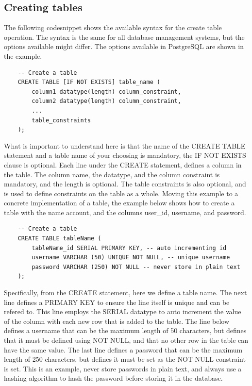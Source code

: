 \subsection{Creating tables}
The following codesnippet shows the available syntax for the create table operation. The syntax is the same for all database management systems, but the options available might differ. The options available in PostgreSQL are shown in the example.

\begin{verbatim}
    -- Create a table
    CREATE TABLE [IF NOT EXISTS] table_name (
        column1 datatype(length) column_constraint,
        column2 datatype(length) column_constraint,
        ...
        table_constraints
    );
\end{verbatim}

What is important to understand here is that the name of the CREATE TABLE statement and a table name of your choosing is mandatory, the IF NOT EXISTS clause is optional. Each line under the CREATE statement, defines a column in the table. The column name, the datatype, and the column constraint is mandatory, and the length is optional. The table constraints is also optional, and is used to define constraints on the table as a whole. Moving this example to a concrete implementation of a table, the example below shows how to create a table with the name account, and the columns user\_id, username, and password.

\begin{verbatim}
    -- Create a table
    CREATE TABLE tableName (
        tableName_id SERIAL PRIMARY KEY, -- auto incrementing id
        username VARCHAR (50) UNIQUE NOT NULL, -- unique username
        password VARCHAR (250) NOT NULL -- never store in plain text
    );
\end{verbatim}

Specifically, from the CREATE statement, here we define a table name. The next line defines a PRIMARY KEY to ensure the line itself is unique and can be refered to. This line employs the SERIAL datatype to auto increment the value of the column with each new row that is added to the table. The line below defines a username that can be the maximum length of 50 characters, but defines that it must be defined using NOT NULL, and that no other row in the table can have the same value. The last line defines a password that can be the maximum length of 250 characters, but defines it must be set as the NOT NULL constraint is set. This is an example, never store passwords in plain text, and always use a hashing algorithm to hash the password before storing it in the database.

